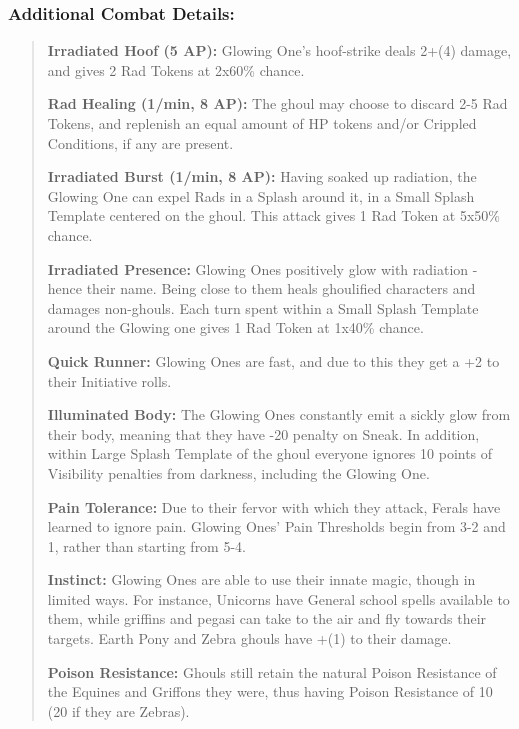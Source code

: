 \documentclass[11pt,a4paper,twocolumn]{book}
\begin{document}
	\subsubsection*{Additional Combat Details:}
	\begin{verse}
		\textbf{Irradiated Hoof (5 AP):} Glowing One's hoof-strike deals 2+(4) damage, and gives 2 Rad Tokens at 2x60\% chance.
		
		\textbf{Rad Healing (1/min, 8 AP):} The ghoul may choose to discard 2-5 Rad Tokens, and replenish an equal amount of HP tokens and/or Crippled Conditions, if any are present.
		
		\textbf{Irradiated Burst (1/min, 8 AP):} Having soaked up radiation, the Glowing One can expel Rads in a Splash around it, in a Small Splash Template centered on the ghoul. This attack gives 1 Rad Token at 5x50\% chance.
		
		\textbf{Irradiated Presence:} Glowing Ones positively glow with radiation - hence their name. Being close to them heals ghoulified characters and damages non-ghouls. Each turn spent within a Small Splash Template around the Glowing one gives 1 Rad Token at 1x40\% chance.
		
		\textbf{Quick Runner:} Glowing Ones are fast, and due to this they get a +2 to their Initiative rolls.
		
		\textbf{Illuminated Body:} The Glowing Ones constantly emit a sickly glow from their body, meaning that they have -20 penalty on Sneak. In addition, within Large Splash Template of the ghoul everyone ignores 10 points of Visibility penalties from darkness, including the Glowing One.
		
		
		\textbf{Pain Tolerance:} Due to their fervor with which they attack, Ferals have learned to ignore pain. Glowing Ones' Pain Thresholds begin from 3-2 and 1, rather than starting from 5-4.
		
		\textbf{Instinct:} Glowing Ones are able to use their innate magic, though in limited ways. For instance, Unicorns have General school spells available to them, while griffins and pegasi can take to the air and fly towards their targets. Earth Pony and Zebra ghouls have +(1) to their damage. 
		
		\textbf{Poison Resistance:} Ghouls still retain the natural Poison Resistance of the Equines and Griffons they were, thus having Poison Resistance of 10 (20 if they are Zebras).
	\end{verse}
	
\end{document}
